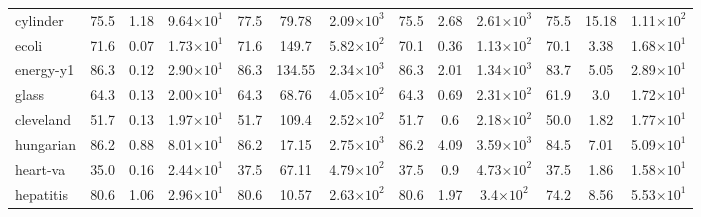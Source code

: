 \begin{table}[t]
\begin{small}
\begin{tabular}{lcccccccccccc}
			cylinder       & 75.5                                 & 1.18                                 & 9.64{\tiny \(\times 10^{1}\)}     & 77.5                            & 79.78  & 2.09{\tiny \(\times 10^{3}\)} & 75.5 & 2.68 & 2.61{\tiny \(\times 10^{3}\)}  & 75.5 & 15.18 & 1.11{\tiny \(\times 10^{2}\)} \\
			ecoli          & 71.6                                 & 0.07                                 & 1.73{\tiny \(\times 10^{1}\)}     & 71.6                            & 149.7  & 5.82{\tiny \(\times 10^{2}\)} & 70.1 & 0.36 & 1.13{\tiny \(\times 10^{2}\)}  & 70.1 & 3.38  & 1.68{\tiny \(\times 10^{1}\)} \\
			energy-y1      & 86.3                                 & 0.12                                 & 2.90{\tiny \(\times 10^{1}\)}     & 86.3                            & 134.55 & 2.34{\tiny \(\times 10^{3}\)} & 86.3 & 2.01 & 1.34{\tiny \(\times 10^{3}\)}  & 83.7 & 5.05  & 2.89{\tiny \(\times 10^{1}\)} \\
			glass          & 64.3                                 & 0.13                                 & 2.00{\tiny \(\times 10^{1}\)}     & 64.3                            & 68.76  & 4.05{\tiny \(\times 10^{2}\)} & 64.3 & 0.69 & 2.31{\tiny \(\times 10^{2}\)}  & 61.9 & 3.0   & 1.72{\tiny \(\times 10^{1}\)} \\
			cleveland      & 51.7                                 & 0.13                                 & 1.97{\tiny \(\times 10^{1}\)}     & 51.7                            & 109.4  & 2.52{\tiny \(\times 10^{2}\)} & 51.7 & 0.6  & 2.18{\tiny \(\times 10^{2 }\)} & 50.0 & 1.82  & 1.77{\tiny \(\times 10^{1}\)} \\
			hungarian      & 86.2                                 & 0.88                                 & 8.01{\tiny \(\times 10^{1}\)}     & 86.2                            & 17.15  & 2.75{\tiny \(\times 10^{3}\)} & 86.2 & 4.09 & 3.59{\tiny \(\times 10^{3}\)}  & 84.5 & 7.01  & 5.09{\tiny \(\times 10^{1}\)} \\
			heart-va       & 35.0                                 & 0.16                                 & 2.44{\tiny \(\times 10^{1}\)}     & 37.5                            & 67.11  & 4.79{\tiny \(\times 10^{2}\)} & 37.5 & 0.9  & 4.73{\tiny \(\times 10^{2 }\)} & 37.5 & 1.86  & 1.58{\tiny \(\times 10^{1}\)} \\
			hepatitis      & 80.6                                 & 1.06                                 & 2.96{\tiny \(\times 10^{1}\)}     & 80.6                            & 10.57  & 2.63{\tiny \(\times 10^{2}\)} & 80.6 & 1.97 & 3.4{\tiny \(\times 10^{2}\)}   & 74.2 & 8.56  & 5.53{\tiny \(\times 10^{1}\)} \\

\end{tabular}
\end{small}
\end{table}
